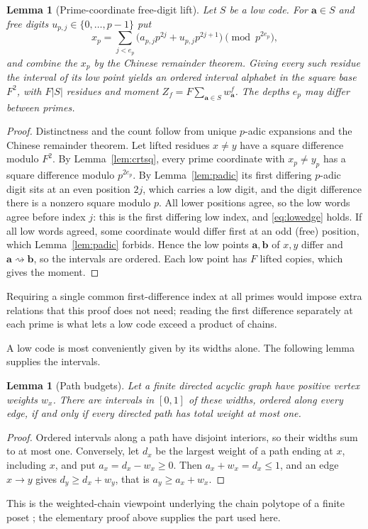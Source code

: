 \documentclass[11pt]{article}
\newtheorem{lemma}[theorem]{Lemma}
\theoremstyle{definition}
\theoremstyle{remark}
\newcommand{\card}[1]{\lvert #1\rvert}
\newcommand{\sto}{\rightsquigarrow}
\begin{document}
\begin{lemma}[Prime-coordinate free-digit lift]\label{lem:odd}
Let $S$ be a low code. For $\mathbf a\in S$ and free digits
$u_{p,j}\in\{0,\ldots,p-1\}$ put
\begin{equation}\label{eq:oddlift}
 x_p=\sum_{j<e_p}\bigl(a_{p,j}p^{2j}+u_{p,j}p^{2j+1}\bigr)\pmod{p^{2e_p}},
\end{equation}
and combine the $x_p$ by the Chinese remainder theorem. Giving every such
residue the interval of its low point yields an ordered interval alphabet in
the square base $F^2$, with $F\card S$ residues and moment
$Z_f=F\sum_{\mathbf a\in S}w_{\mathbf a}^f$. The depths $e_p$ may differ
between primes.
\end{lemma}
\begin{proof}
Distinctness and the count follow from unique $p$-adic expansions and the
Chinese remainder theorem. Let lifted residues $x\ne y$ have a square
difference modulo $F^2$. By Lemma~\ref{lem:crtsq}, every prime coordinate with
$x_p\ne y_p$ has a square difference modulo $p^{2e_p}$. By
Lemma~\ref{lem:padic} its first differing $p$-adic digit sits at an even
position $2j$, which carries a low digit, and the digit difference there is a
nonzero square modulo $p$. All lower positions agree, so the low words agree
before index $j$: this is the first differing low index, and
\eqref{eq:lowedge} holds. If all low words agreed, some coordinate would
differ first at an odd (free) position, which Lemma~\ref{lem:padic} forbids.
Hence the low points $\mathbf a,\mathbf b$ of $x,y$ differ and
$\mathbf a\sto\mathbf b$, so the intervals are ordered. Each
low point has $F$ lifted copies, which gives the moment.
\end{proof}
Requiring a single common first-difference index at all primes would impose
extra relations that this proof does not need; reading the first difference
separately at each prime is what lets a low code exceed a product of chains.

A low code is most conveniently given by its widths alone. The following
lemma supplies the intervals.

\begin{lemma}[Path budgets]\label{lem:paths}
Let a finite directed acyclic graph have positive vertex weights $w_x$.
There are intervals in $[0,1]$ of these widths, ordered along every edge,
if and only if every directed path has total weight at most one.
\end{lemma}
\begin{proof}
Ordered intervals along a path have disjoint interiors, so their widths sum to
at most one. Conversely, let $d_x$ be the largest weight of a path ending at
$x$, including $x$, and put $a_x=d_x-w_x\ge0$. Then $a_x+w_x=d_x\le1$, and an
edge $x\to y$ gives $d_y\ge d_x+w_y$, that is $a_y\ge a_x+w_x$.
\end{proof}
This is the weighted-chain viewpoint underlying the chain polytope of a
finite poset \cite{Stanley1986}; the elementary proof above supplies the part
used here.
\end{document}
